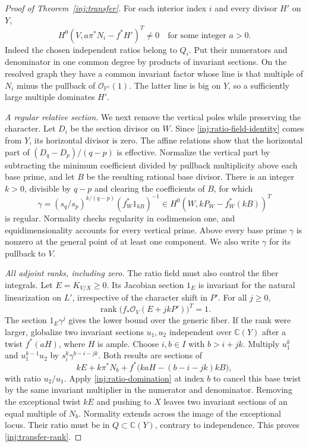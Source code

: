 \begin{proof}[Proof of Theorem~\ref{inj:transfer}]
For each interior index $i$ and every divisor $H'$ on $Y$,
\begin{equation}\label{inj:ratio-domination}
 H^0(V,a\pi^*N_i-f^*H')^T\ne0
 \quad\text{for some integer }a>0.
\end{equation}
Indeed the chosen independent ratios belong to $Q_i$.  Put their
numerators and denominator in one common degree by products of
invariant sections.  On the resolved graph they have a common
invariant factor whose line is that multiple of $N_i$ minus the
pullback of $\mathcal O_{\mathbb P^e}(1)$.  The latter line is
big on $Y$, so a sufficiently large multiple dominates $H'$.

\smallskip\noindent\textit{A regular relative section.} We next remove the vertical poles while preserving the character. Let $D_i$ be the section divisor on $W$.  Since
\eqref{inj:ratio-field-identity} comes from $Y$, its horizontal
divisor is zero.  The affine relations show that the horizontal
part of $(D_q-D_p)/(q-p)$ is effective.  Normalize the vertical
part by subtracting the minimum coefficient divided by pullback
multiplicity above each base prime, and let $B$ be the resulting
rational base divisor.  There is an integer $k>0$, divisible by
$q-p$ and clearing the coefficients of $B$, for which
\begin{equation}\label{inj:gamma}
 \gamma=(s_q/s_p)^{k/(q-p)}(f_W^*1_{kB})^{-1}
 \in H^0(W,kP_W-f_W^*(kB))^T
\end{equation}
is regular.  Normality checks regularity in codimension one, and
equidimensionality accounts for every vertical prime.  Above every
base prime $\gamma$ is nonzero at the general point of at least
one component.  We also write $\gamma$ for its pullback to $V$.

\smallskip\noindent\textit{All adjoint ranks, including zero.} The ratio field must also control the fiber integrals. Let $E=K_{V/X}\ge0$.  Its Jacobian section $1_E$ is invariant
for the natural linearization on $L'$, irrespective of the character
shift in $P'$.  For all $j\ge0$,
\begin{equation}\label{inj:transfer-rank}
 \operatorname{rank}
 \bigl(f_*\mathcal O_V(E+jkP')\bigr)^T=1.
\end{equation}
The section $1_E\gamma^j$ gives the lower bound over the generic
fiber.  If the rank were larger, globalize two invariant sections
$u_1,u_2$ independent over $\mathbb C(Y)$ after a twist $f^*(aH)$,
where $H$ is ample.  Choose $i,b\in I$ with $b>i+jk$.  Multiply
$u_1^k$ and $u_1^{k-1}u_2$ by
$s_i^k\gamma^{b-i-jk}$.  Both results are sections of
\[
 kE+k\pi^*N_b+
 f^*\bigl(kaH-(b-i-jk)kB\bigr),
\]
with ratio $u_2/u_1$.  Apply \eqref{inj:ratio-domination} at
index $b$ to cancel this base twist by the same invariant multiplier
in the numerator and denominator.  Removing the exceptional twist
$kE$ and pushing to $X$ leaves two invariant sections of an equal
multiple of $N_b$.  Normality extends across the image of the
exceptional locus.  Their ratio must be in $Q\subset\mathbb C(Y)$,
contrary to independence.  This proves \eqref{inj:transfer-rank}.


\end{proof}
